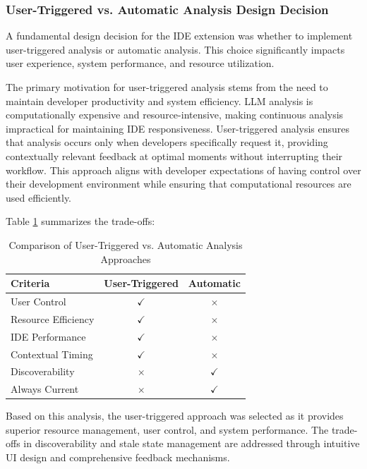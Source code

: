 \begin{spacing}{1.2}
\subsubsection{User-Triggered vs. Automatic Analysis Design Decision}
A fundamental design decision for the IDE extension was whether to implement user-triggered analysis or automatic analysis. This choice significantly impacts user experience, system performance, and resource utilization.

The primary motivation for user-triggered analysis stems from the need to maintain developer productivity and system efficiency. LLM analysis is computationally expensive and resource-intensive, making continuous analysis impractical for maintaining IDE responsiveness. User-triggered analysis ensures that analysis occurs only when developers specifically request it, providing contextually relevant feedback at optimal moments without interrupting their workflow. This approach aligns with developer expectations of having control over their development environment while ensuring that computational resources are used efficiently.

Table \ref{tab:analysis_approaches} summarizes the trade-offs:

\begin{table}[H]
\centering
\caption{Comparison of User-Triggered vs. Automatic Analysis Approaches}
\label{tab:analysis_approaches}
\begin{tabular}{|l|c|c|}
\hline
\textbf{Criteria} & \textbf{User-Triggered} & \textbf{Automatic} \\
\hline
User Control & $\checkmark$ & $\times$ \\
\hline
Resource Efficiency & $\checkmark$ & $\times$ \\
\hline
IDE Performance & $\checkmark$ & $\times$ \\
\hline
Contextual Timing & $\checkmark$ & $\times$ \\
\hline
Discoverability & $\times$ & $\checkmark$ \\
\hline
Always Current & $\times$ & $\checkmark$ \\
\hline
\end{tabular}
\end{table}

Based on this analysis, the user-triggered approach was selected as it provides superior resource management, user control, and system performance. The trade-offs in discoverability and stale state management are addressed through intuitive UI design and comprehensive feedback mechanisms.


\end{spacing}
